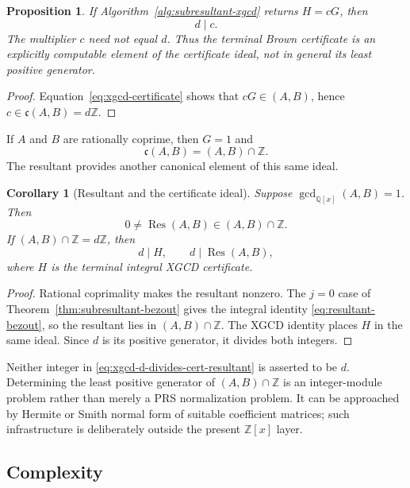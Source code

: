 \documentclass[11pt]{book}
\newtheorem{proposition}[theorem]{Proposition}
\newtheorem{corollary}[theorem]{Corollary}
\theoremstyle{definition}
\newcommand{\ZZ}{\mathbb Z}
\begin{document}
\begin{proposition}\label{prop:xgcd-certificate-ideal}
If Algorithm~\ref{alg:subresultant-xgcd} returns $H=cG$, then
\[
 d\mid c.
\]
The multiplier $c$ need not equal $d$.  Thus the terminal Brown certificate
is an explicitly computable element of the certificate ideal, not in general
its least positive generator.
\end{proposition}

\begin{proof}
Equation~\eqref{eq:xgcd-certificate} shows that $cG\in(A,B)$, hence
$c\in\mathfrak c(A,B)=d\ZZ$.
\end{proof}

If $A$ and $B$ are rationally coprime, then $G=1$ and
\[
 \mathfrak c(A,B)=(A,B)\cap\ZZ.
\]
The resultant provides another canonical element of this same ideal.

\begin{corollary}[Resultant and the certificate ideal]
\label{cor:xgcd-resultant-ideal}
Suppose $\gcd_{\mathbb Q[x]}(A,B)=1$.  Then
\[
 0\ne\operatorname{Res}(A,B)\in(A,B)\cap\ZZ.
\]
If $(A,B)\cap\ZZ=d\ZZ$, then
\begin{equation}\label{eq:xgcd-d-divides-cert-resultant}
 d\mid H,
 \qquad
 d\mid\operatorname{Res}(A,B),
\end{equation}
where $H$ is the terminal integral XGCD certificate.
\end{corollary}

\begin{proof}
Rational coprimality makes the resultant nonzero.  The $j=0$ case of
Theorem~\ref{thm:subresultant-bezout} gives the integral identity
\eqref{eq:resultant-bezout}, so the resultant lies in $(A,B)\cap\ZZ$.
The XGCD identity places $H$ in the same ideal.  Since $d$ is its positive
generator, it divides both integers.
\end{proof}

Neither integer in \eqref{eq:xgcd-d-divides-cert-resultant} is asserted to be
$d$.  Determining the least positive generator of $(A,B)\cap\ZZ$ is an
integer-module problem rather than merely a PRS normalization problem.  It
can be approached by Hermite or Smith normal form of suitable coefficient
matrices; such infrastructure is deliberately outside the present
$\ZZ[x]$ layer.

\subsection{Complexity}
\end{document}
